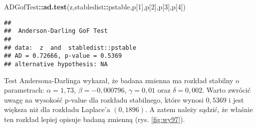 \documentclass[polish,]{book}
\newenvironment{Shaded}{\begin{snugshade}}{\end{snugshade}}
\newcommand{\DecValTok}[1]{\textcolor[rgb]{0.00,0.00,0.81}{#1}}
\newcommand{\KeywordTok}[1]{\textcolor[rgb]{0.13,0.29,0.53}{\textbf{#1}}}
\newcommand{\NormalTok}[1]{#1}
\newcommand{\OperatorTok}[1]{\textcolor[rgb]{0.81,0.36,0.00}{\textbf{#1}}}
\begin{document}
\begin{Shaded}
\begin{Highlighting}[]
\NormalTok{ADGofTest}\OperatorTok{::}\KeywordTok{ad.test}\NormalTok{(z,stabledist}\OperatorTok{::}\NormalTok{pstable,p[}\DecValTok{1}\NormalTok{],p[}\DecValTok{2}\NormalTok{],p[}\DecValTok{3}\NormalTok{],p[}\DecValTok{4}\NormalTok{])}
\end{Highlighting}
\end{Shaded}

\begin{verbatim}
## 
##  Anderson-Darling GoF Test
## 
## data:  z  and  stabledist::pstable
## AD = 0.72666, p-value = 0.5369
## alternative hypothesis: NA
\end{verbatim}

Test Andersona-Darlinga wykazał, że badana zmienna ma rozkład stabilny o parametrach: \(\alpha = 1,73\), \(\beta = -0,000796\), \(\gamma = 0,01\) oraz \(\delta = 0,002\). Warto zwrócić
uwagę na wysokość p-value dla rozkładu stabilnego, które wynosi \(0,5369\) i jest większa
niż dla rozkładu Laplace'a \((0,1896)\). A zatem należy sądzić, że właśnie ten rozkład
lepiej opisuje badaną zmienną (rys. \ref{fig:wy97}).
\end{document}
